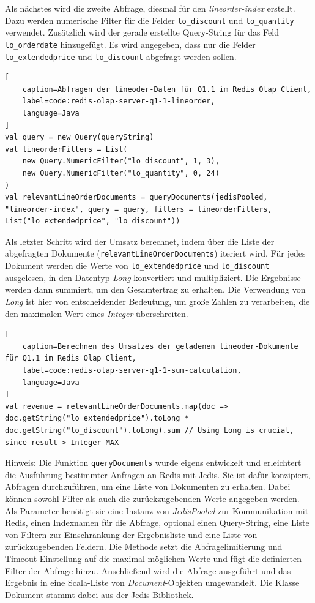 Als nächstes wird die zweite Abfrage, diesmal für den \emph{lineorder-index} erstellt. Dazu werden numerische Filter für die Felder \lstinline|lo_discount| und \lstinline|lo_quantity| verwendet. Zusätzlich wird der gerade erstellte Query-String für das Feld \lstinline|lo_orderdate| hinzugefügt. Es wird angegeben, dass nur die Felder \lstinline|lo_extendedprice| und \lstinline|lo_discount| abgefragt werden sollen.

\begin{lstlisting}[
    caption=Abfragen der lineoder-Daten für Q1.1 im Redis Olap Client,
    label=code:redis-olap-server-q1-1-lineorder,
    language=Java
]
val query = new Query(queryString)
val lineorderFilters = List(
	new Query.NumericFilter("lo_discount", 1, 3),
	new Query.NumericFilter("lo_quantity", 0, 24)
)
val relevantLineOrderDocuments = queryDocuments(jedisPooled, "lineorder-index", query = query, filters = lineorderFilters, List("lo_extendedprice", "lo_discount"))
\end{lstlisting}


Als letzter Schritt wird der Umsatz berechnet, indem über die Liste der abgefragten Dokumente (\lstinline|relevantLineOrderDocuments|) iteriert wird. Für jedes Dokument werden die Werte von \lstinline|lo_extendedprice| und \lstinline|lo_discount| ausgelesen, in den Datentyp \emph{Long} konvertiert und multipliziert. Die Ergebnisse werden dann summiert, um den Gesamtertrag zu erhalten. Die Verwendung von \emph{Long} ist hier von entscheidender Bedeutung, um große Zahlen zu verarbeiten, die den maximalen Wert eines \emph{Integer} überschreiten.

\begin{lstlisting}[
    caption=Berechnen des Umsatzes der geladenen lineoder-Dokumente für Q1.1 im Redis Olap Client,
    label=code:redis-olap-server-q1-1-sum-calculation,
    language=Java
]
val revenue = relevantLineOrderDocuments.map(doc => doc.getString("lo_extendedprice").toLong * doc.getString("lo_discount").toLong).sum // Using Long is crucial, since result > Integer MAX
\end{lstlisting}

Hinweis: Die Funktion \lstinline|queryDocuments| wurde eigens entwickelt und erleichtert die Ausführung bestimmter Anfragen an Redis mit Jedis. Sie ist dafür konzipiert, Abfragen durchzuführen, um eine Liste von Dokumenten zu erhalten. Dabei können sowohl Filter als auch die zurückzugebenden Werte angegeben werden. Als Parameter benötigt sie eine Instanz von \emph{JedisPooled} zur Kommunikation mit Redis, einen Indexnamen für die Abfrage, optional einen Query-String, eine Liste von Filtern zur Einschränkung der Ergebnisliste und eine Liste von zurückzugebenden Feldern. Die Methode setzt die Abfragelimitierung und Timeout-Einstellung auf die maximal möglichen Werte und fügt die definierten Filter der Abfrage hinzu. Anschließend wird die Abfrage ausgeführt und das Ergebnis in eine Scala-Liste von \emph{Document}-Objekten umgewandelt. Die Klasse Dokument stammt dabei aus der Jedis-Bibliothek.

